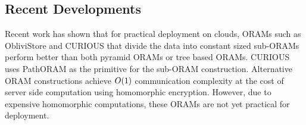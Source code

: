 \subsection{Recent Developments}
\label{oram:related:recent}
%
Recent work \cite{curious} has shown that for practical deployment on clouds, ORAMs such as ObliviStore \cite{oblivistore} and CURIOUS \cite{curious} that 
divide the data into constant sized sub-ORAMs perform better than both pyramid ORAMs or tree based ORAMs. CURIOUS uses PathORAM as the primitive for the 
sub-ORAM construction. 
Alternative ORAM constructions \cite{onionoram,comporam} achieve $O(1)$ communication complexity at the cost of server side computation using 
homomorphic encryption. However, due to expensive homomorphic computations, these ORAMs are not yet practical for deployment.